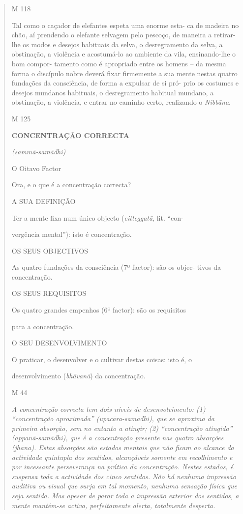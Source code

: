 \begin{quote}
M 118

Tal como o caçador de elefantes espeta uma enorme esta- ca de madeira no chão, aí prendendo o elefante selvagem pelo pescoço, de maneira a retirar-lhe os modos e desejos habituais da selva, o desregramento da selva, a obstinação, a violência e acostumá-lo ao ambiente da vila, ensinando-lhe o bom compor- tamento como é apropriado entre os homens -- da mesma forma o discípulo nobre deverá fixar firmemente a sua mente nestas quatro fundações da consciência, de forma a expulsar de si pró- prio os costumes e desejos mundanos habituais, o desregramento habitual mundano, a obstinação, a violência, e entrar no caminho certo, realizando o \emph{Nibbāna}.

M 125

\textbf{CONCENTRAÇÃO CORRECTA}

\emph{(sammā-samādhi)}

O Oitavo Factor

Ora, e o que é a concentração correcta?

A SUA DEFINIÇÃO

Ter a mente fixa num único objecto (\emph{citteggatā}, lit. ``con-

vergência mental''): isto é concentração.

OS SEUS OBJECTIVOS

As quatro fundações da consciência (7º factor): são os objec- tivos da concentração.

OS SEUS REQUISITOS

Os quatro grandes empenhos (6º factor): são os requisitos

para a concentração.

O SEU DESENVOLVIMENTO

O praticar, o desenvolver e o cultivar destas coisas: isto é, o

desenvolvimento (\emph{bhāvanā}) da concentração.

M 44

\emph{A concentração correcta tem dois níveis de desenvolvimento: (1) ``concentração aproximada'' (upacāra-samādhi), que se aproxima da primeira absorção, sem no entanto a atingir; (2) ``concentração atingida'' (appanā-samādhi), que é a concentração presente nas quatro absorções (jhāna). Estas absorções são estados mentais que não ficam ao alcance da actividade quíntupla dos sentidos, alcançáveis somente em recolhimento e por incessante perseverança na prática da concentração. Nestes estados, é suspensa toda a actividade dos cinco sentidos. Não há nenhuma impressão auditiva ou visual que surja em tal momento, nenhuma sensação física que seja sentida. Mas apesar de parar toda a impressão exterior dos sentidos, a mente mantém-se activa, perfeitamente alerta, totalmente desperta.}


\end{quote}
